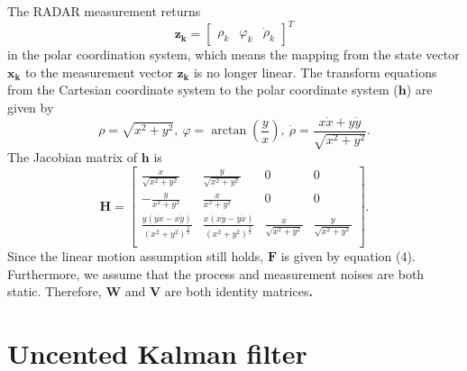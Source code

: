 \documentclass[12pt]{article}
\begin{document}
The RADAR measurement returns
%
\begin{equation}
	{\mathbf{z}_{\mathbf{k}} = \begin{bmatrix} \rho_{k} & \varphi_{k} & 	{\dot{\rho}}_{k} \end{bmatrix}}^{T}
\end{equation}
%
in the polar coordination system, which means the mapping from the state vector \(\mathbf{x}_{\mathbf{k}}\) to the measurement vector \(\mathbf{z}_{\mathbf{k}}\) is no longer linear. The transform equations from the Cartesian coordinate system to the polar coordinate system (\(\mathbf{h}\)) are given by
%
\begin{equation}
	\rho = \sqrt{x^{2} + y^{2}},\ \varphi = \arctan( \frac{y}{x}),\ 	\dot{\rho} = \frac{x\dot{x} + y\dot{y}}{\sqrt{x^{2} + y^{2}}}.
\end{equation}
%
The Jacobian matrix of \(\mathbf{h}\) is
%
\begin{equation}
	\renewcommand{\arraystretch}{1.5}
	\mathbf{H} = \begin{bmatrix}
	\frac{x}{\sqrt{x^{2} + y^{2}}} & \frac{y}{\sqrt{x^{2} + y^{2}}} & 0 & 0 \\
	 - \frac{y}{x^{2} + y^{2}} & \frac{x}{x^{2} + y^{2}} & 0 & 0 \\
	\frac{y( y\dot{x} - x\dot{y})}{( x^{2} + y^{2})^{\frac{3}{2}}} & \frac{x( x\dot{y} - y\dot{x})}{( x^{2} + y^{2})^{\frac{3}{2}}} & \frac{x}{\sqrt{x^{2} + y^{2}}} & \frac{y}{\sqrt{x^{2} + y^{2}}} \\
	\end{bmatrix}.
\end{equation}
%
Since the linear motion assumption still holds, \(\mathbf{F}\) is 
given by equation (4). Furthermore, we assume that the process and
measurement noises are both static. Therefore, \(\mathbf{W}\) and
\(\mathbf{V}\) are both identity matrices\textbf{.}


\section{Uncented Kalman filter}\label{uncented-kalman-filter}
\end{document}
